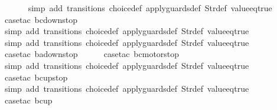 \begin{isabellebody}
\ \ \ \ \ \isamarkupfalse%
\ {\isacharparenleft}simp\ add{\isacharcolon}\ transitions\ choice{\isacharunderscore}def\ apply{\isacharunderscore}guards{\isacharunderscore}def\ Str{\isacharunderscore}def\ value{\isacharunderscore}eq{\isacharunderscore}true{\isacharparenright}\isanewline
\ \ \ \ \isamarkupfalse%
\ {\isacharparenleft}case{\isacharunderscore}tac\ {\isachardoublequoteopen}bc{\isacharequal}down{}{}stop{\isachardoublequoteclose}{\isacharparenright}\isanewline
\ \ \ \ \ \isamarkupfalse%
\ {\isacharparenleft}simp\ add{\isacharcolon}\ transitions\ choice{\isacharunderscore}def\ apply{\isacharunderscore}guards{\isacharunderscore}def\ Str{\isacharunderscore}def\ value{\isacharunderscore}eq{\isacharunderscore}true{\isacharparenright}\isanewline
\ \ \isamarkupfalse%
\ {\isacharparenleft}simp\ add{\isacharcolon}\ transitions\ choice{\isacharunderscore}def\ apply{\isacharunderscore}guards{\isacharunderscore}def\ Str{\isacharunderscore}def\ value{\isacharunderscore}eq{\isacharunderscore}true{\isacharparenright}\isanewline
\ \ \ \isamarkupfalse%
\ {\isacharparenleft}case{\isacharunderscore}tac\ {\isachardoublequoteopen}ba{\isacharequal}down{}{}stop{\isachardoublequoteclose}{\isacharparenright}\isanewline
\ \ \ \ \isamarkupfalse%
\ {\isacharparenleft}case{\isacharunderscore}tac\ {\isachardoublequoteopen}bc{\isacharequal}motorstop{}{\isachardoublequoteclose}{\isacharparenright}\isanewline
\ \ \ \ \ \isamarkupfalse%
\ {\isacharparenleft}simp\ add{\isacharcolon}\ transitions\ choice{\isacharunderscore}def\ apply{\isacharunderscore}guards{\isacharunderscore}def\ Str{\isacharunderscore}def\ value{\isacharunderscore}eq{\isacharunderscore}true{\isacharparenright}\isanewline
\ \ \ \ \isamarkupfalse%
\ {\isacharparenleft}case{\isacharunderscore}tac\ {\isachardoublequoteopen}bc{\isacharequal}up{}{}stop{\isachardoublequoteclose}{\isacharparenright}\isanewline
\ \ \ \ \ \isamarkupfalse%
\ {\isacharparenleft}simp\ add{\isacharcolon}\ transitions\ choice{\isacharunderscore}def\ apply{\isacharunderscore}guards{\isacharunderscore}def\ Str{\isacharunderscore}def\ value{\isacharunderscore}eq{\isacharunderscore}true{\isacharparenright}\isanewline
\ \ \ \ \isamarkupfalse%
\ {\isacharparenleft}case{\isacharunderscore}tac\ {\isachardoublequoteopen}bc{\isacharequal}up{}{}{\isachardoublequoteclose}{\isacharparenright}\isanewline

\end{isabellebody}
